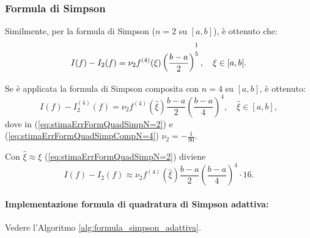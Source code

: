 \subsubsection{Formula di Simpson}
Similmente, per la formula di Simpson ($n=2$ su $[a,b]$), è ottenuto che:
\begin{equation}\label{eq:stimaErrFormQuadSimpN=2}
    I(f)-I_2(f)=\nu_2 f^{(4)}(\xi)\left(\frac{b-a}{2}\right)^{\overset{\footnotemark}{5}},\quad \xi\in[a,b].
\end{equation}

Se è applicata la formula di Simpson composita con $n=4$ su $[a,b]$, è ottenuto:
\begin{equation}\label{eq:stimaErrFormQuadSimpCompN=4}
    I(f)-I_2^{(4)}(f)=\nu_2 f^{(4)}(\widehat\xi)\frac{b-a}{2}\left(\frac{b-a}{4}\right)^4,\quad \widehat\xi\in[a,b],
\end{equation}
dove in (\ref{eq:stimaErrFormQuadSimpN=2}) e (\ref{eq:stimaErrFormQuadSimpCompN=4}) $\nu_2=-\frac{1}{90}$.

Con $\widehat\xi\approx\xi$ (\ref{eq:stimaErrFormQuadSimpN=2}) diviene
\begin{equation}\label{eq:trasfXiToXi}
    I(f)-I_2(f)\approx\nu_2 f^{(4)}(\widehat\xi)\frac{b-a}{2}\left(\frac{b-a}{4}\right)^4\cdot 16.
\end{equation}

\paragraph{Implementazione formula di quadratura di Simpson adattiva:} Vedere l'Algoritmo \ref{alg:formula_simpson_adattiva}.

